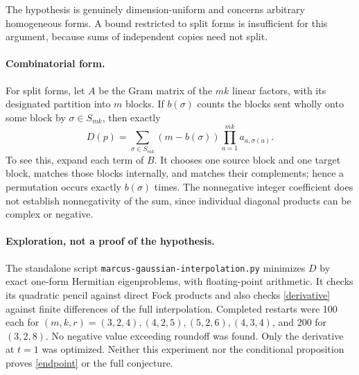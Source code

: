 \documentclass[11pt]{article}
\begin{document}
The hypothesis is genuinely dimension-uniform and concerns arbitrary
homogeneous forms. A bound restricted to split forms is insufficient for
this argument, because sums of independent copies need not split.

\paragraph{Combinatorial form.}
For split forms, let $A$ be the Gram matrix of the $mk$ linear factors,
with its designated partition into $m$ blocks. If $b(\sigma)$ counts the
blocks sent wholly onto some block by $\sigma\in S_{mk}$, then exactly
\[
 D(p)=\sum_{\sigma\in S_{mk}}(m-b(\sigma))
                    \prod_{a=1}^{mk}a_{a,\sigma(a)}.
\]
To see this, expand each term of $B$. It chooses one source block and one
target block, matches those blocks internally, and matches their
complements; hence a permutation occurs exactly $b(\sigma)$ times.
The nonnegative integer coefficient does not establish nonnegativity of
the sum, since individual diagonal products can be complex or negative.

\paragraph{Exploration, not a proof of the hypothesis.}
The standalone script \texttt{marcus-gaussian-interpolation.py} minimizes
$D$ by exact one-form Hermitian eigenproblems, with floating-point arithmetic.
It checks its quadratic pencil against direct Fock products and also checks
\eqref{derivative} against finite differences of the full interpolation.
Completed restarts were 100 each for $(m,k,r)=(3,2,4),(4,2,5),(5,2,6),(4,3,4)$,
and 200 for $(3,2,8)$. No negative value exceeding roundoff was found.
Only the derivative at $t=1$ was optimized. Neither this experiment nor the
conditional proposition proves \eqref{endpoint} or the full conjecture.
\end{document}
